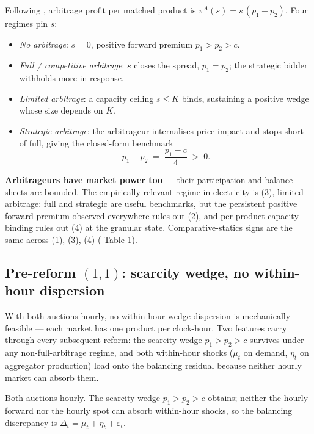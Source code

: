 \documentclass[11pt]{article}
\begin{document}
Following \citet[\S I.A and Table 1]{ito_reguant_2016}, arbitrage profit per matched product is $\pi^A(s) = s\,(p_1 - p_2)$. Four regimes pin $s$:
\begin{itemize}
\item[(1)] \emph{No arbitrage}: $s = 0$, positive forward premium $p_1 > p_2 > c$.
\item[(2)] \emph{Full / competitive arbitrage}: $s$ closes the spread, $p_1 = p_2$; the strategic bidder withholds more in response.
\item[(3)] \emph{Limited arbitrage}: a capacity ceiling $s \le K$ binds, sustaining a positive wedge whose size depends on $K$.
\item[(4)] \emph{Strategic arbitrage}: the arbitrageur internalises price impact and stops short of full, giving the closed-form benchmark
\begin{equation}
\boxed{\;p_1 - p_2 \;=\; \frac{p_1 - c}{4} \;>\; 0.\;}
\label{eq:strategic-arb}
\end{equation}
\end{itemize}
\textbf{Arbitrageurs have market power too} --- their participation and balance sheets are bounded. The empirically relevant regime in electricity is (3), limited arbitrage: full and strategic are useful benchmarks, but the persistent positive forward premium observed everywhere rules out (2), and per-product capacity binding rules out (4) at the granular state. Comparative-statics signs are the same across (1), (3), (4) (\citeauthor{ito_reguant_2016} Table 1).

\subsection{Pre-reform $(1,1)$: scarcity wedge, no within-hour dispersion}\label{sec:pre}

With both auctions hourly, no within-hour wedge dispersion is mechanically feasible --- each market has one product per clock-hour. Two features carry through every subsequent reform: the \citeauthor{ito_reguant_2016} scarcity wedge $p_1 > p_2 > c$ survives under any non-full-arbitrage regime, and both within-hour shocks ($\mu_t$ on demand, $\eta_t$ on aggregator production) load onto the balancing residual because neither hourly market can absorb them.

Both auctions hourly. The \citeauthor{ito_reguant_2016} scarcity wedge $p_1 > p_2 > c$ obtains; neither the hourly forward nor the hourly spot can absorb within-hour shocks, so the balancing discrepancy is $\Delta_t = \mu_t + \eta_t + \varepsilon_t$.
\end{document}
